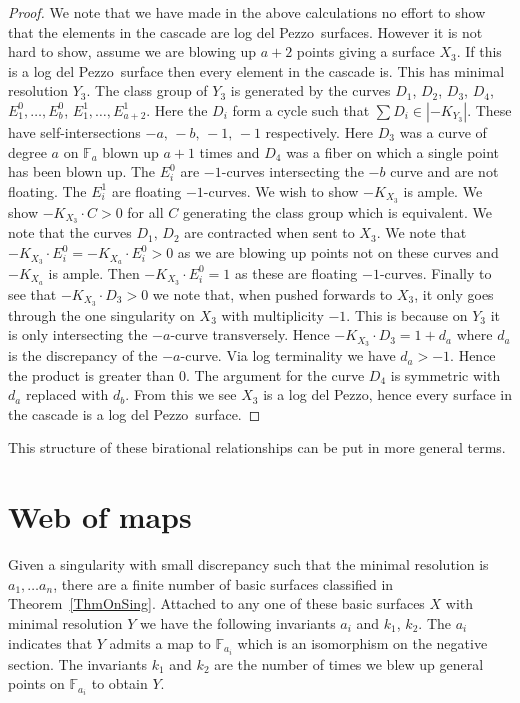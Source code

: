 \documentclass[12pt,a4paper]{book}      %
\theoremstyle{definition}
\newcommand{\ldp}{log del Pezzo}
\newcommand{\mb}[1]{\mathbb{#1}}
\begin{document}
\begin{proof}
 
We note that we have made in the above calculations no effort to show that the elements in the cascade are \ldp\ surfaces. However it is not hard to show, assume we are blowing up $a+2$ points giving a surface $X_3$. If this is a \ldp\ surface then every element in the cascade is. This has minimal resolution $Y_3$. The class group of $Y_3$ is generated by the curves $D_1$, $D_2$, $D_3$, $D_4$, $E_1^0, \dots, E_b^0$,  $E_1^1, \dots, E_{a+2}^1$. Here the $D_i$ form a cycle such that $\sum D_i \in |{-}K_{Y_3}|$. These have self-intersections $-a, \, -b, \, -1, \, -1$ respectively. Here $D_3$ was a curve of degree $a$  on $\mb{F}_a$ blown up $a+1$ times and $D_4$ was a fiber on which a single point has been blown up. The $E_i^0$ are $-1$-curves intersecting the $-b$ curve and are not floating. The $E_i^1$ are floating $-1$-curves. We wish to show ${-}K_{X_3}$ is ample. We show $-K_{X_3} \cdot C > 0$ for all $C$ generating the class group which is equivalent. We note that the curves $D_1, \, D_2$ are contracted when sent to $X_3$. We note that ${-}K_{X_3} \cdot E_i^0 = {-}K_{X_a} \cdot E_i^0 > 0$ as we are blowing up points not on these curves and ${-}K_{X_a}$ is ample. Then $-K_{X_3} \cdot E_i^0 = 1$ as these are floating $-1$-curves. Finally to see that $-K_{X_3} \cdot D_3 > 0$ we note that, when pushed forwards to $X_3$, it only goes through the one singularity on $X_3$ with multiplicity $-1$. This is because on $Y_3$ it is only intersecting the $-a$-curve transversely. Hence $-K_{X_3} \cdot D_3 = 1 + d_a$ where $d_a$ is the discrepancy of the $-a$-curve. Via log terminality we have $d_a > -1$. Hence the product is greater than 0. The argument for the curve $D_4$ is symmetric with $d_a$ replaced with $d_b$. From this we see $X_3$ is a \ldp, hence every surface in the cascade is a \ldp\ surface.
\end{proof}

This structure of these birational relationships can be put in more general terms. 

\section{Web of maps}
Given a singularity with small discrepancy such that the minimal resolution is $a_1, \dots a_n$, there are a finite number of basic surfaces classified in Theorem~\ref{ThmOnSing}. Attached to any one of these basic surfaces $X$ with minimal resolution $Y$ we have the following invariants $a_i$ and $k_1$, $k_2$. The $a_i$ indicates that $Y$ admits a map to $\mb{F}_{a_i}$ which is an isomorphism on the negative section. The invariants $k_1$ and $k_2$ are the number of times we blew up general points on $\mb{F}_{a_i}$ to obtain $Y$.
\end{document}
